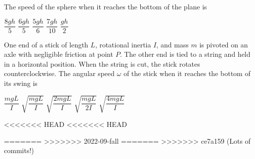 \documentclass{../../oss-apphys-exam}
\newcounter{lastmc}
\newcounter{lastmc}
\begin{document}
\begin{multicols*}{2}
\begin{questions}
    \question The speed of the sphere when it reaches the bottom of the plane is
    \begin{choices}
      \choice $\dfrac{8gh}5$
      \choice $\dfrac{6gh}5$
      \choice $\dfrac{5gh}6$
      \choice $\dfrac{7gh}{10}$
      \choice $\dfrac{gh}2$
    \end{choices}
    \label{hollow2}
    \columnbreak
    
    \question One end of a stick of length $L$, rotational inertia $I$, and
    mass $m$ is pivoted on an axle with negligible friction at point $P$. The
    other end is tied to a string and held in a horizontal position. When the
    string is cut, the stick rotates counterclockwise. The angular speed
    $\omega$ of the stick when it reaches the bottom of its swing is
    \begin{choices}
      \choice $\dfrac{mgL}I$
      \choice $\sqrt{\dfrac{mgL}I}$
      \choice $\sqrt{\dfrac{2mgL}I}$
      \choice $\sqrt{\dfrac{mgL}{2I}}$
      \choice $\sqrt{\dfrac{4mgL}I}$
    \end{choices}
  \end{questions}
  \setcounter{lastmc}{\value{question}}
\end{multicols*}
\newpage

<<<<<<< HEAD
<<<<<<< HEAD

=======
>>>>>>> 2022-09-fall
=======
>>>>>>> ce7a159 (Lots of commits!)


\begin{center}
\end{center}
\end{document}
